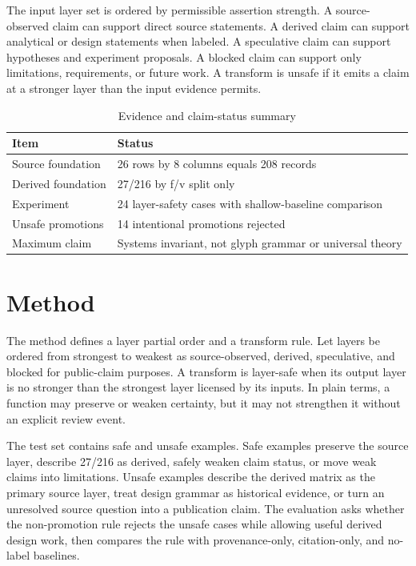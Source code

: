 \documentclass[sigconf,nonacm]{acmart}
\begin{document}
The input layer set is ordered by permissible assertion strength. A
source-observed claim can support direct source statements. A derived claim can
support analytical or design statements when labeled. A speculative claim can
support hypotheses and experiment proposals. A blocked claim can support only
limitations, requirements, or future work. A transform is unsafe if it emits a
claim at a stronger layer than the input evidence permits.


\begin{table}[t]
\caption{Evidence and claim-status summary}
\label{tab:layer_safety}
\begin{tabular}{p{}p{}}
\toprule
Item & Status \\
\midrule
Source foundation & 26 rows by 8 columns equals 208 records \\
Derived foundation & 27/216 by f/v split only \\
Experiment & 24 layer-safety cases with shallow-baseline comparison \\
Unsafe promotions & 14 intentional promotions rejected \\
Maximum claim & Systems invariant, not glyph grammar or universal theory \\
\bottomrule
\end{tabular}
\end{table}


\section{Method}
The method defines a layer partial order and a transform rule. Let layers be
ordered from strongest to weakest as source-observed, derived, speculative, and
blocked for public-claim purposes. A transform is layer-safe when its output
layer is no stronger than the strongest layer licensed by its inputs. In plain
terms, a function may preserve or weaken certainty, but it may not strengthen it
without an explicit review event.

The test set contains safe and unsafe examples. Safe examples preserve the
source layer, describe 27/216 as derived, safely weaken claim status, or move
weak claims into limitations. Unsafe examples describe the derived matrix as the
primary source layer, treat design grammar as historical evidence, or turn an
unresolved source question into a publication claim. The evaluation asks whether
the non-promotion rule rejects the unsafe cases while allowing useful derived
design work, then compares the rule with provenance-only, citation-only, and
no-label baselines.
\end{document}
